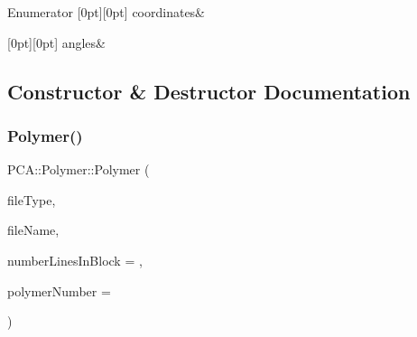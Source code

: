 \begin{DoxyEnumFields}{Enumerator}
[0pt][0pt]{}\hypertarget{class_p_c_a_1_1_polymer_a1df36a764fbf04ccd5cbe8edb49d43bda8387d77faaaa65484f5631d9f9d20bfc}{}\label{class_p_c_a_1_1_polymer_a1df36a764fbf04ccd5cbe8edb49d43bda8387d77faaaa65484f5631d9f9d20bfc} 
coordinates&\\
\hline

[0pt][0pt]{}\hypertarget{class_p_c_a_1_1_polymer_a1df36a764fbf04ccd5cbe8edb49d43bda9bd139e0f52be4a748903ff60b5d3985}{}\label{class_p_c_a_1_1_polymer_a1df36a764fbf04ccd5cbe8edb49d43bda9bd139e0f52be4a748903ff60b5d3985} 
angles&\\
\hline

\end{DoxyEnumFields}


\subsection{Constructor \& Destructor Documentation}
\hypertarget{class_p_c_a_1_1_polymer_ac835d908dc32b787ca80f26cd0e6c68b}{}\label{class_p_c_a_1_1_polymer_ac835d908dc32b787ca80f26cd0e6c68b} 
\subsubsection{\texorpdfstring{Polymer()}{Polymer()}\hspace{0.1cm}{\footnotesize\ttfamily [1/3]}}
{\footnotesize\ttfamily P\+C\+A\+::\+Polymer\+::\+Polymer (\begin{DoxyParamCaption}\item[{\hyperlink{class_p_c_a_1_1_polymer_a1df36a764fbf04ccd5cbe8edb49d43bd}{File\+Type}}]{file\+Type,  }\item[{char $\ast$}]{file\+Name,  }\item[{int}]{number\+Lines\+In\+Block = {},  }\item[{int}]{polymer\+Number = {} }\end{DoxyParamCaption})}



